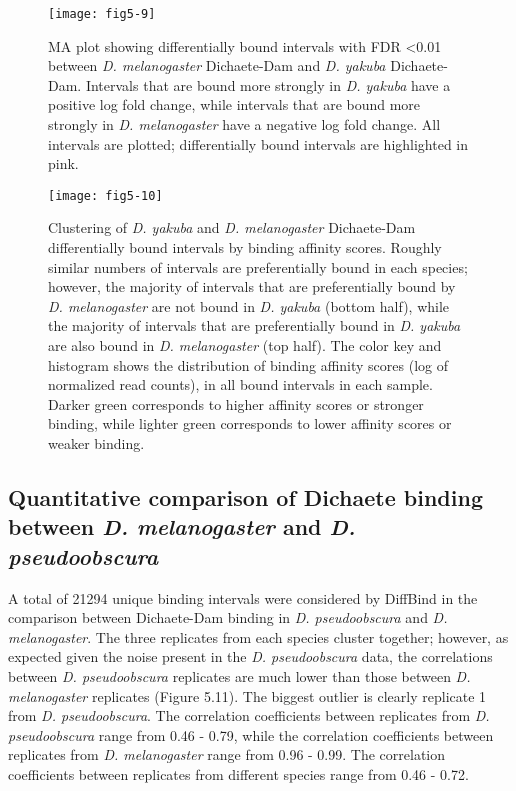 \begin{figure}
\centering
\texttt{[image: fig5-9]}
\caption{MA plot showing differentially bound intervals with FDR \textless 0.01 between \emph{D. melanogaster} Dichaete-Dam and \emph{D. yakuba} Dichaete-Dam. Intervals that are bound more strongly in \emph{D. yakuba} have a positive log fold change, while intervals that are bound more strongly in \emph{D. melanogaster} have a negative log fold change. All intervals are plotted; differentially bound intervals are highlighted in pink.}
\label{Figure 5.9}
\end{figure}

\begin{figure}
\centering
\texttt{[image: fig5-10]}
\caption{Clustering of \emph{D. yakuba} and \emph{D. melanogaster} Dichaete-Dam differentially bound intervals by binding affinity scores. Roughly similar numbers of intervals are preferentially bound in each species; however, the majority of intervals that are preferentially bound by \emph{D. melanogaster} are not bound in \emph{D. yakuba} (bottom half), while the majority of intervals that are preferentially bound in \emph{D. yakuba} are also bound in \emph{D. melanogaster} (top half). The color key and histogram shows the distribution of binding affinity scores (log of normalized read counts), in all bound intervals in each sample. Darker green corresponds to higher affinity scores or stronger binding, while lighter green corresponds to lower affinity scores or weaker binding.}
\label{Figure 5.10}
\end{figure}

\subsection{Quantitative comparison of Dichaete binding between \emph{D. melanogaster} and \emph{D. pseudoobscura}}
A total of 21294 unique binding intervals were considered by DiffBind in the comparison between Dichaete-Dam binding in \emph{D. pseudoobscura} and \emph{D. melanogaster}. The three replicates from each species cluster together; however, as expected given the noise present in the \emph{D. pseudoobscura} data, the correlations between \emph{D. pseudoobscura} replicates are much lower than those between \emph{D. melanogaster} replicates (Figure 5.11). The biggest outlier is clearly replicate 1 from \emph{D. pseudoobscura}. The correlation coefficients between replicates from \emph{D. pseudoobscura} range from 0.46 - 0.79, while the correlation coefficients between replicates from \emph{D. melanogaster} range from 0.96 - 0.99. The correlation coefficients between replicates from different species range from 0.46 - 0.72.\\

